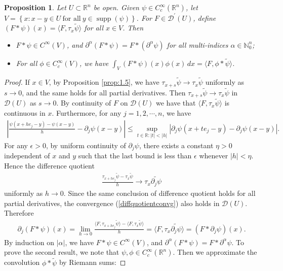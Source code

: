 \documentclass{article}
\numberwithin{equation}{section}
\newcommand{\bbN}{\mathbb{N}}
\newcommand{\bbR}{\mathbb{R}}
\renewcommand{\cal}{\mathcal}
\newcommand{\wt}{\widetilde}
\DeclareMathOperator{\supp}{supp}
\theoremstyle{plain}
\newtheorem{proposition}[theorem]{Proposition}
\theoremstyle{definition}
\begin{document}
\begin{proposition}\label{convolutionD}
Let $U\subset\bbR^n$ be open. Given $\psi\in C_c^\infty(\bbR^n)$, let $V=\left\{x:x-y\in U\ \text{for all}\ y\in\supp(\psi)\right\}$. For $F\in\cal{D}^\prime(U)$, define $(F*\psi)(x)=\langle F,\tau_x\wt\psi\rangle$ for all $x\in V$. Then
\begin{itemize}
	\item[(i)] $F*\psi\in C^\infty(V)$, and $\partial^\alpha(F*\psi)=F*(\partial^\alpha\psi)$ for all multi-indices $\alpha\in\bbN_0^n$;
	\item[(ii)] For all $\phi\in C_c^\infty(V)$, we have $\int_V(F*\psi)(x)\phi(x)\,dx=\langle F,\phi*\wt\psi\rangle$.
\end{itemize}
\end{proposition}
\begin{proof}
If $x\in V$, by Proposition \ref{prop:1.5}, we have $\tau_{x+s}\wt\psi\to\tau_x\wt\psi$ uniformly as $s\to 0$, and the same holds for all partial derivatives. Then $\tau_{x+s}\wt\psi\to\tau_x\wt\psi$ in $\cal{D}(U)$ as $s\to 0$. By continuity of $F$ on $\cal{D}(U)$ we have that $\langle F,\tau_x\wt\psi\rangle$ is continuous in $x$. Furthermore, for any $j=1,2,\cdots,n$, we have
\begin{align*}
	\left\vert\frac{\psi(x+he_j-y)-\psi(x-y)}{h}-\partial_j\psi(x-y)\right\vert\leq\sup_{t\in\bbR:\vert t\vert<\vert h\vert}\left\vert\partial_j\psi(x+te_j-y)-\partial_j\psi(x-y)\right\vert.
\end{align*}
For any $\epsilon>0$, by uniform continuity of $\partial_j\psi$, there exists a constant $\eta>0$ independent of $x$ and $y$ such that the last bound is less than $\epsilon$ whenever $\vert h\vert<\eta$. Hence the difference quotient \begin{align}
	\frac{\tau_{x+he_j}\wt\psi-\tau_x\wt\psi}{h}\to\tau_x\wt{\partial_j\psi}\label{diffquotientconvg}
\end{align}
uniformly as $h\to 0$. Since the same conclusion of difference quotient holds for all partial derivatives, the convergence (\ref{diffquotientconvg}) also holds in $\cal{D}(U)$. Therefore 
\begin{align*}
	\partial_j(F*\psi)(x)=\lim_{h\to 0} \frac{\langle F,\tau_{x+he_j}\wt\psi\rangle-\langle F,\tau_x\wt\psi\rangle}{h}=\langle F,\tau_x\wt{\partial_j\psi}\rangle=(F*\partial_j\psi)(x).
\end{align*}
By induction on $\vert\alpha\vert$, we have $F*\psi\in C^\infty(V)$, and $\partial^\alpha(F*\psi)=F*\partial^\alpha\psi$. To prove the second result, we note that $\psi,\phi\in C_c^\infty(\bbR^n)$. Then we approximate the convolution $\phi*\wt\psi$ by Riemann sums:

\end{proof}
\end{document}
